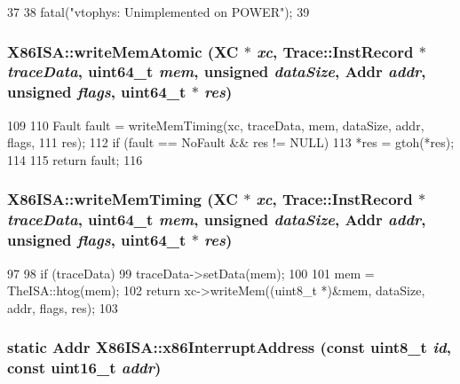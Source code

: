 \begin{DoxyCode}
37 {
38     fatal("vtophys: Unimplemented on POWER\n");
39 }
\end{DoxyCode}
\hypertarget{namespaceX86ISA_a6a314d196cff35a2cc8043015e5dcc8b}{
\subsubsection[{writeMemAtomic}]{ X86ISA::writeMemAtomic (XC $\ast$ {\em xc}, \/  {\bf Trace::InstRecord} $\ast$ {\em traceData}, \/  uint64\_\-t {\em mem}, \/  unsigned {\em dataSize}, \/  {\bf Addr} {\em addr}, \/  unsigned {\em flags}, \/  uint64\_\-t $\ast$ {\em res})}}
\label{namespaceX86ISA_a6a314d196cff35a2cc8043015e5dcc8b}



\begin{DoxyCode}
109 {
110     Fault fault = writeMemTiming(xc, traceData, mem, dataSize, addr, flags,
111             res);
112     if (fault == NoFault && res != NULL) {
113         *res = gtoh(*res);
114     }
115     return fault;
116 }
\end{DoxyCode}
\hypertarget{namespaceX86ISA_a758dc026bb35ddb9da038acfb4f8ac3a}{
\subsubsection[{writeMemTiming}]{ X86ISA::writeMemTiming (XC $\ast$ {\em xc}, \/  {\bf Trace::InstRecord} $\ast$ {\em traceData}, \/  uint64\_\-t {\em mem}, \/  unsigned {\em dataSize}, \/  {\bf Addr} {\em addr}, \/  unsigned {\em flags}, \/  uint64\_\-t $\ast$ {\em res})}}
\label{namespaceX86ISA_a758dc026bb35ddb9da038acfb4f8ac3a}



\begin{DoxyCode}
97 {
98     if (traceData) {
99         traceData->setData(mem);
100     }
101     mem = TheISA::htog(mem);
102     return xc->writeMem((uint8_t *)&mem, dataSize, addr, flags, res);
103 }
\end{DoxyCode}
\hypertarget{namespaceX86ISA_a2f44ed2c4b9c14c0eab6bdc3b8b95c03}{
\subsubsection[{x86InterruptAddress}]{\setlength{\rightskip}{0pt plus 5cm}static {\bf Addr} X86ISA::x86InterruptAddress (const uint8\_\-t {\em id}, \/  const uint16\_\-t {\em addr})}}
\label{namespaceX86ISA_a2f44ed2c4b9c14c0eab6bdc3b8b95c03}



